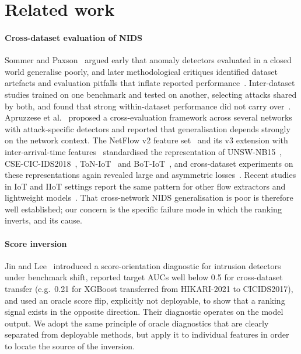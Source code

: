 \documentclass[preprint,12pt]{elsarticle}
\begin{document}
\section{Related work}
\label{sec:related}

\paragraph{Cross-dataset evaluation of NIDS}
Sommer and Paxson~\cite{sommer2010outside} argued early that anomaly detectors evaluated in a closed world generalise poorly, and later methodological critiques identified dataset artefacts and evaluation pitfalls that inflate reported performance~\cite{arp2022dos,engelen2021troubleshooting,kenyon2020public}. Inter-dataset studies trained on one benchmark and tested on another, selecting attacks shared by both, and found that strong within-dataset performance did not carry over~\cite{dhooge2020inter}. Apruzzese et al.~\cite{apruzzese2022cross} proposed a cross-evaluation framework across several networks with attack-specific detectors and reported that generalisation depends strongly on the network context. The NetFlow v2 feature set~\cite{sarhan2021netflow,sarhan2022standard} and its v3 extension with inter-arrival-time features~\cite{luay2025temporal} standardised the representation of UNSW-NB15~\cite{moustafa2015unsw}, CSE-CIC-IDS2018~\cite{sharafaldin2018toward}, ToN-IoT~\cite{moustafa2021new} and BoT-IoT~\cite{koroniotis2019towards}, and cross-dataset experiments on these representations again revealed large and asymmetric losses~\cite{sarhan2022evaluating,layeghy2023explainable}. Recent studies in IoT and IIoT settings report the same pattern for other flow extractors and lightweight models~\cite{guerra2026exploring,hakim2026cross}. That cross-network NIDS generalisation is poor is therefore well established; our concern is the specific failure mode in which the ranking inverts, and its cause.

\paragraph{Score inversion}
Jin and Lee~\cite{jin2026benchmark} introduced a score-orientation diagnostic for intrusion detectors under benchmark shift, reported target AUCs well below 0.5 for cross-dataset transfer (e.g.\ 0.21 for XGBoost transferred from HIKARI-2021 to CICIDS2017), and used an oracle score flip, explicitly not deployable, to show that a ranking signal exists in the opposite direction. Their diagnostic operates on the model output. We adopt the same principle of oracle diagnostics that are clearly separated from deployable methods, but apply it to individual features in order to locate the source of the inversion.
\end{document}

